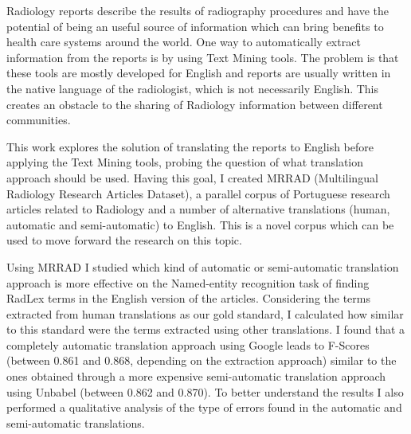 \begin{abstracts}

Radiology reports describe the results of radiography procedures and have the potential of being an useful source of information which can bring benefits to health care systems around the world. One way to automatically extract information from the reports is by using Text Mining tools. The problem is that these tools are mostly developed for English and reports are usually written in the native language of the radiologist, which is not necessarily English. This creates an obstacle to the sharing of Radiology information between different communities.

This work explores the solution of translating the reports to English before applying the Text Mining tools, probing the question of what translation approach should be used. Having this goal, I created MRRAD (Multilingual Radiology Research Articles Dataset), a parallel corpus of Portuguese research articles related to Radiology and a number of alternative translations (human, automatic and semi-automatic) to English. This is a novel corpus which can be used to move forward the research on this topic. 

Using MRRAD I studied which kind of automatic or semi-automatic translation approach is more effective on the Named-entity recognition task of finding RadLex terms in the English version of the articles. Considering the terms extracted from human translations as our gold standard, I calculated how similar to this standard were the terms extracted using other translations. I found that a completely automatic translation approach using Google leads to F-Scores (between 0.861 and 0.868, depending on the extraction approach) similar to the ones obtained through a more expensive semi-automatic translation approach using Unbabel (between 0.862 and 0.870). To better understand the results I also performed a qualitative analysis of the type of errors found in the automatic and semi-automatic translations.

\end{abstracts}
